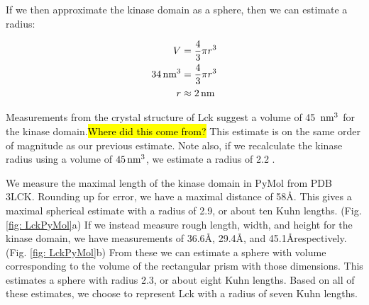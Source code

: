 \documentclass[../AdvancementSummary.tex]{subfiles}
\begin{document}
If we then approximate the kinase domain as a sphere, then we can estimate a radius: 

\begin{align*}
V &= \frac{4}{3}\pi r^3 \\
34 \,\mbox{nm}^3 &= \frac{4}{3} \pi r^3 \\
r &\approx 2 \,\mbox{nm} \\
\end{align*}

Measurements from the crystal structure of Lck suggest a volume of 45 $\,\mbox{nm}^3$ for the kinase domain.\hl{Where did this come from?}  This estimate is on the same order of magnitude as our previous estimate.  Note also, if we recalculate the kinase radius using a volume of $45 \,\mbox{nm}^3$, we estimate a radius of 2.2 \nm. 

We measure the maximal length of the kinase domain in PyMol from PDB 3LCK. Rounding up for error, we have a maximal distance of 58\AA. This gives a maximal spherical estimate with a radius of 2.9\nm, or about ten Kuhn lengths. (Fig. \ref{fig: LckPyMol}a) If we instead measure rough length, width, and height for the kinase domain, we have measurements of 36.6\AA, 29.4\AA, and 45.1\AA respectively. (Fig. \ref{fig: LckPyMol}b) From these we can estimate a sphere with volume corresponding to the volume of the rectangular prism with those dimensions.  This estimates a sphere with radius 2.3\nm, or about eight Kuhn lengths. Based on all of these estimates, we choose to represent Lck with a radius of seven Kuhn lengths.
\end{document}
